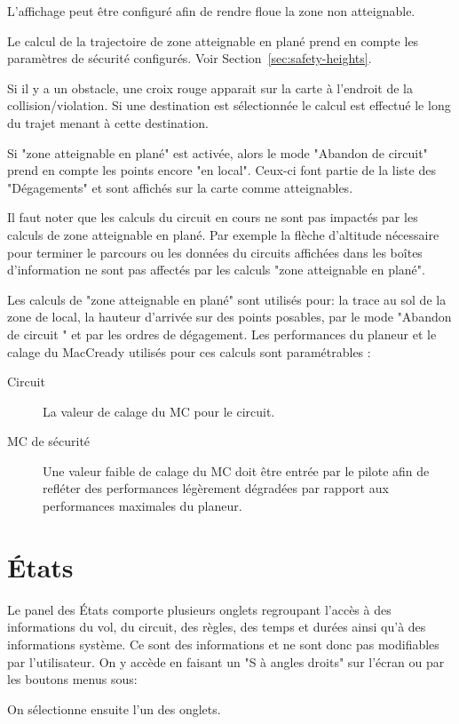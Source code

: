 L'affichage peut être configuré afin de rendre floue la zone non atteignable.  

Le calcul de la trajectoire de zone atteignable en plané prend en compte les paramètres de sécurité configurés.  Voir Section~\ref{sec:safety-heights}.

Si il y a un obstacle, une croix rouge apparait sur la carte à l'endroit de la collision/violation. Si une destination est sélectionnée le calcul est effectué le long du trajet menant à cette destination.

Si "zone atteignable en plané" est activée, alors le mode "Abandon de circuit" prend en compte les points encore "en local". Ceux-ci font partie de la liste des "Dégagements" et sont affichés sur la carte comme atteignables.

Il faut noter que les calculs du circuit en cours ne sont pas impactés par les calculs de zone atteignable en plané. Par exemple la flèche d'altitude nécessaire pour terminer le parcours ou les données du circuits affichées dans les boîtes d'information ne sont pas affectés par les calculs "zone atteignable en plané".

Les calculs de "zone atteignable en plané" sont utilisés pour: la trace au sol de la zone de local, la hauteur d'arrivée sur des points posables, par le mode "Abandon de circuit " et par les ordres de dégagement. Les performances du planeur et le calage du MacCready utilisés pour ces calculs sont paramétrables :
\begin{description}
\item[Circuit] La valeur de calage du MC pour le circuit.
\item[MC de sécurité] Une valeur faible de calage du MC doit être entrée par le pilote afin de refléter des performances légèrement dégradées par rapport aux performances maximales du planeur. 

\end{description}


\section{États}\label{sec:flight-status}

Le panel des États comporte plusieurs onglets regroupant l'accès à des informations du vol, du circuit, des règles, des temps et durées ainsi qu'à des informations système. Ce sont des informations et ne sont donc pas modifiables par l'utilisateur.
On y accède en faisant un "S à angles droits" sur l'écran ou par les boutons menus sous:
\begin{quote}
\blink{}
\end{quote}
On sélectionne ensuite l'un des onglets.

